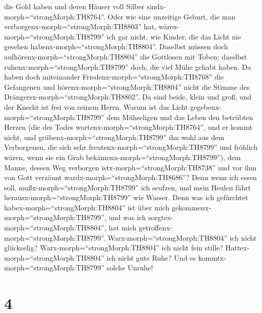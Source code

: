 die Gold haben und deren Häuser voll Silber
sindx-morph=``strongMorph:TH8764''.  Oder wie eine
unzeitige Geburt, die man verborgenx-morph=``strongMorph:TH8803'' hat,
wärex-morph=``strongMorph:TH8799'' ich gar nicht, wie Kinder, die das
Licht nie gesehen habenx-morph=``strongMorph:TH8804''. 
Daselbst müssen doch aufhörenx-morph=``strongMorph:TH8804'' die
Gottlosen mit Toben; daselbst ruhenx-morph=``strongMorph:TH8799'' doch,
die viel Mühe gehabt haben.  Da haben doch miteinander
Friedenx-morph=``strongMorph:TH8768'' die Gefangenen und
hörenx-morph=``strongMorph:TH8804'' nicht die Stimme des
Drängersx-morph=``strongMorph:TH8802''.  Da sind beide,
klein und groß, und der Knecht ist frei von seinem Herrn. 
Warum ist das Licht gegebenx-morph=``strongMorph:TH8799'' dem Mühseligen
und das Leben den betrübten Herzen  (die des Todes
wartenx-morph=``strongMorph:TH8764'', und er kommt nicht, und
grübenx-morph=``strongMorph:TH8799'' ihn wohl aus dem Verborgenen,
 die sich sehr freutenx-morph=``strongMorph:TH8799'' und
fröhlich wären, wenn sie ein Grab
bekämenx-morph=``strongMorph:TH8799''),  dem Manne, dessen
Weg verborgen istx-morph=``strongMorph:TH8738'' und vor ihm von Gott
verzäunt wardx-morph=``strongMorph:TH8686''?  Denn wenn ich
essen soll, mußx-morph=``strongMorph:TH8799'' ich seufzen, und mein
Heulen fährt herausx-morph=``strongMorph:TH8799'' wie Wasser.
 Denn was ich gefürchtet habex-morph=``strongMorph:TH8804''
ist über mich gekommenx-morph=``strongMorph:TH8799'', und was ich
sorgtex-morph=``strongMorph:TH8804'', hat mich
getroffenx-morph=``strongMorph:TH8799''. 
Warx-morph=``strongMorph:TH8804'' ich nicht glückselig?
Warx-morph=``strongMorph:TH8804'' ich nicht fein stille?
Hattex-morph=``strongMorph:TH8804'' ich nicht gute Ruhe? Und es
kommtx-morph=``strongMorph:TH8799'' solche Unruhe!

\hypertarget{section-3}{%
\section{4}\label{section-3}}

